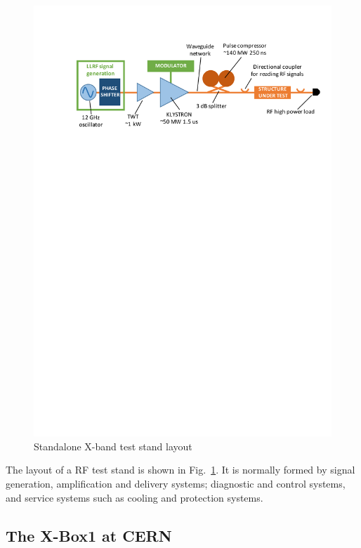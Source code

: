 \begin{figure}[h]
\centering 
\includegraphics[scale=0.8]{pictures/test_stand_scheme.pdf}
\caption{Standalone X-band test stand layout}
\label{xbox_layout}
\end{figure}

The layout of a RF test stand is shown in Fig.~\ref{xbox_layout}. It is normally formed by signal generation, amplification and delivery systems; diagnostic and control systems, and service systems such as cooling and protection systems. 


\subsection[The X-Box1 at CERN]{The X-Box1 at CERN}


